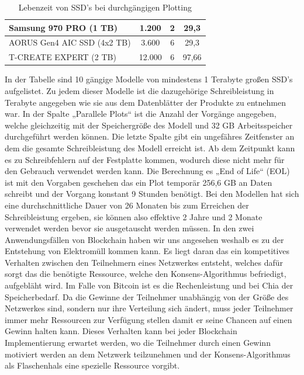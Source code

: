\begin{table}
\begin{tabular}{l|c|c|c}
		\hline
		Samsung 970 PRO (1 TB)          & 1.200                                                                   & 2                                                         & 29,3                                                                \\ 
		\hline
		AORUS Gen4 AIC SSD (4x2 TB)   & 3.600                                                                   & 6                                                         & 29,3                                                                \\ 
		\hline
		T-CREATE EXPERT (2 TB) & 12.000                                                                  & 6                                                         & 97,66                                                               \\
		\hline
	\end{tabular}
	\caption{Lebenzeit von SSD's bei durchgängigen Plotting}
\end{table}
In der Tabelle sind 10 gängige Modelle von mindestens 1 Terabyte großen SSD’s aufgelistet. Zu jedem dieser Modelle ist die dazugehörige Schreibleistung in Terabyte angegeben wie sie aus dem Datenblätter der Produkte zu entnehmen war. In der Spalte „Parallele Plots“ ist die Anzahl der Vorgänge angegeben, welche gleichzeitig mit der Speichergröße des Modell und 32 GB Arbeitsspeicher durchgeführt werden können. Die letzte Spalte gibt ein ungefähres Zeitfenster an dem die gesamte Schreibleistung des Modell erreicht ist. Ab dem Zeitpunkt kann es zu Schreibfehlern auf der Festplatte kommen, wodurch diese nicht mehr für den Gebrauch verwendet werden kann. Die Berechnung es „End of Life“ (EOL) ist mit den Vorgaben geschehen das ein Plot temporär 256,6 GB an Daten schreibt und der Vorgang konstant 9 Stunden benötigt. Bei den Modellen hat sich eine durchschnittliche Dauer von 26 Monaten bis zum Erreichen der Schreibleistung ergeben, sie können also effektive 2 Jahre und 2 Monate verwendet werden bevor sie ausgetauscht werden müssen.
\newline
In den zwei Anwendungsfällen von Blockchain haben wir uns angesehen weshalb es zu der Entstehung von Elektromüll kommen kann. Es liegt daran das ein kompetitives Verhalten zwischen den Teilnehmern eines Netzwerkes entsteht, welches dafür sorgt das die benötigte Ressource, welche den Konsens-Algorithmus befriedigt, aufgebläht wird. Im Falle von Bitcoin ist es die Rechenleistung und bei Chia der Speicherbedarf. Da die Gewinne der Teilnehmer unabhängig von der Größe des Netzwerkes sind, sondern nur ihre Verteilung sich ändert, muss jeder Teilnehmer immer mehr Ressourcen zur Verfügung stellen damit er seine Chancen auf einen Gewinn halten kann. Dieses Verhalten kann bei jeder Blockchain Implementierung erwartet werden, wo die Teilnehmer durch einen Gewinn motiviert werden an dem Netzwerk teilzunehmen und der Konsens-Algorithmus als Flaschenhals eine spezielle Ressource vorgibt.
\clearpage

